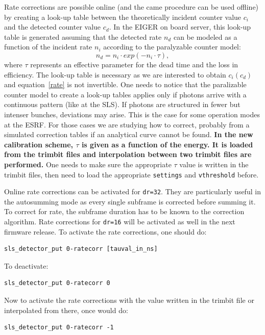 \documentclass{article}
\begin{document}
Rate corrections are possible online (and the came procedure can be used offline) by creating a look-up table between the theoretically incident counter value $c_i$ and the detected counter value $c_d$. 
In the EIGER on board server, this look-up table is generated assuming that the detected rate $n_d$ can be modeled as a function of the incident rate $n_i$ according to the paralyzable counter model:
\begin{equation}
n_d= n_i \cdot exp(-n_i \cdot \tau),
\label{rate}
\end{equation}
where $\tau$ represents an effective parameter for the dead time and the loss in efficiency. The look-up table is necessary as we are interested to obtain $c_i(c_d)$ and equation~\ref{rate} is not invertible. One needs to notice that the paralizable counter model to create a look-up tables applies only if photons arrive with a continuous pattern (like at the SLS). If photons are structured in fewer but intenser bunches, deviations may arise. This is the case for some operation modes at the ESRF. For those cases we are studying how to correct, probably from a simulated correction tables if an analytical curve cannot be found.  
\textbf{In the new calibration scheme, $\tau$ is given as a function of the energy. It is loaded from the trimbit files and interpolation between two trimbit files are performed.} One needs to make sure the appropriate $\tau$ value is written in the trimbit files, then need to load the appropriate {\tt{settings}} and {\tt{vthreshold}} before.

Online rate corrections can be activated for {\tt{dr=32}}. They are particularly useful in the autosumming mode as  every single subframe is corrected before summing it. To correct for rate, the subframe duration has to be known to the correction algorithm. Rate corrections for {\tt{dr=16}} will be activated as well in the next firmware release.     
To activate the rate corrections, one should do:\\
\begin{verbatim}
sls_detector_put 0-ratecorr [tauval_in_ns]
\end{verbatim}
To deactivate:
\begin{verbatim}
sls_detector_put 0-ratecorr 0
\end{verbatim}

 Now to activate the rate corrections with the value written in the trimbit file or interpolated from there, once would do: 
\begin{verbatim}
sls_detector_put 0-ratecorr -1
\end{verbatim}
\end{document}
